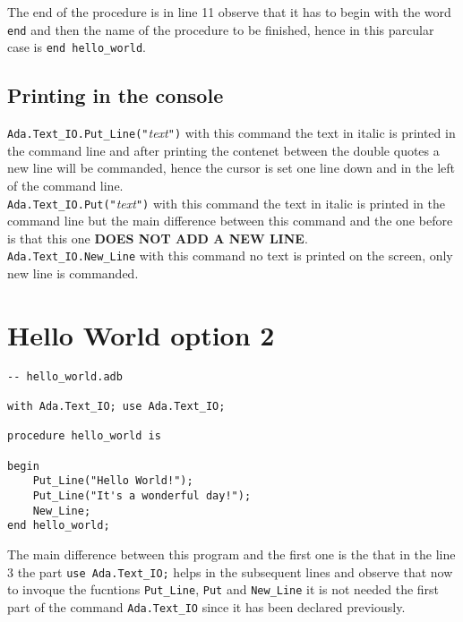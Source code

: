 \documentclass[paper=a4, fontsize=11pt]{scrartcl} %
\numberwithin{equation}{section} %
\numberwithin{figure}{section} %
\numberwithin{table}{section} %
\begin{document}
The end of the procedure is in line 11 observe that it has to begin with the word \verb+end+ and then the name of the procedure to be finished, hence in this parcular case is \verb+end hello_world+. 

\subsection{Printing in the console}

\verb|Ada.Text_IO.Put_Line("|\textit{text}\verb|")| with this command the text in italic is printed in the command line and after printing the contenet between the double quotes a new line will be commanded, hence the cursor is set one line down and in the left of the command line.\\

\verb|Ada.Text_IO.Put("|\textit{text}\verb|")| with this command the text in italic is printed in the command line but the main difference between this command and the one before is that this one \textbf{DOES NOT ADD A NEW LINE}.\\

\verb|Ada.Text_IO.New_Line| with this command no text is printed on the screen, only new line is commanded.

\section{Hello World option 2}
 
\begin{lstlisting}
-- hello_world.adb

with Ada.Text_IO; use Ada.Text_IO;

procedure hello_world is

begin
    Put_Line("Hello World!");
    Put_Line("It's a wonderful day!");
    New_Line;
end hello_world;
\end{lstlisting}

The main difference between this program and the first one is the that in the line 3 the part \verb|use Ada.Text_IO;| helps in the subsequent lines and observe that now to invoque the fucntions \verb|Put_Line|, \verb|Put| and \verb|New_Line| it is not needed the first part of the command \verb|Ada.Text_IO| since it has been declared previously.\\
\end{document}
